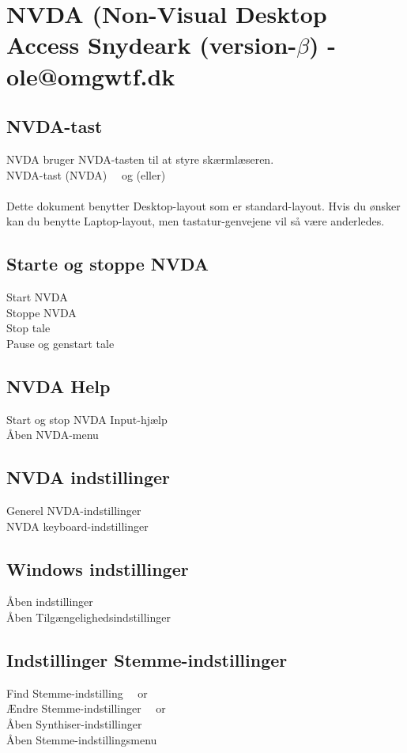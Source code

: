 \documentclass[a4paper, landscape, 11pt]{scrartcl}
\newcommand{\command}[2]{#1~\dotfill{}~#2\\} %
\begin{document}
\section*{NVDA (Non-Visual Desktop Access Snydeark (version-$\beta$) - ole@omgwtf.dk}

\hrulefill{}

\begin{multicols}{2}

\subsection*{NVDA-tast}
NVDA bruger NVDA-tasten til at styre skærmlæseren. \\ 
\command{NVDA-tast (NVDA)}{ og (eller) \keys{Insert}} \\
Dette dokument benytter Desktop-layout som er standard-layout. Hvis du ønsker kan du benytte Laptop-layout, men tastatur-genvejene vil så være anderledes.

\subsection*{Starte og stoppe NVDA}
\command{Start NVDA}{}
\command{Stoppe NVDA}{}
\command{Stop tale}{\keys{\ctrl}}
\command{Pause og genstart tale}{\keys{\shift}}

\subsection*{NVDA Help}
\command{Start og stop NVDA Input-hjælp}{}
\command{Åben NVDA-menu}{}

\subsection*{NVDA indstillinger}
\command{Generel NVDA-indstillinger}{}
\command{NVDA keyboard-indstillinger}{}

\subsection*{Windows indstillinger}
\command{Åben indstillinger}{}
\command{Åben Tilgængelighedsindstillinger}{\keys{\faWindows + u}}

\subsection*{Indstillinger Stemme-indstillinger}
\command{Find Stemme-indstilling}{\keys{NVDA + \ctrl + \arrowkeyleft} or \keys{\arrowkeyright}}
\command{Ændre Stemme-indstillinger}{\keys{NVDA + \ctrl + \arrowkeyup} or \keys{\arrowkeydown}}
\command{Åben Synthiser-indstillinger}{}
\command{Åben Stemme-indstillingsmenu}{}


\end{multicols}
\end{document}
